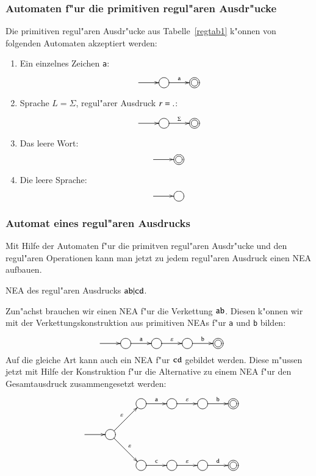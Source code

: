 \subsubsection{Automaten f"ur die primitiven regul"aren Ausdr"ucke}
Die primitiven regul"aren Ausdr"ucke aus Tabelle~\ref{regtab1} k"onnen
von folgenden Automaten akzeptiert werden:
\begin{enumerate}
\item Ein einzelnes Zeichen {\tt a}:
\[
\entrymodifiers={++[o][F]}
\xymatrix{
*+\txt{}\ar[r]
	&{}\ar[r]^{\tt a}
		&*++[o][F=]{}
}
\]
\item Sprache $L=\Sigma$, regul"arer Ausdruck $r={\tt .}$:
\[
\entrymodifiers={++[o][F]}
\xymatrix{
*+\txt{}\ar[r]
	&{}\ar[r]^{\Sigma}
		&*++[o][F=]{}
}
\]
\item Das leere Wort:
\[
\entrymodifiers={++[o][F]}
\xymatrix{
*+\txt{}\ar[r]
	&*++[o][F=]{}
}
\]
\item Die leere Sprache:
\[
\entrymodifiers={++[o][F]}
\xymatrix{
*+\txt{}\ar[r]
	&{}
}
\]
\end{enumerate}

\subsubsection{Automat eines regul"aren Ausdrucks}
Mit Hilfe der Automaten f"ur die primitven regul"aren Ausdr"ucke
und den regul"aren Operationen kann man jetzt zu jedem regul"aren
Ausdruck einen NEA aufbauen.

\begin{beispiel}[\bf Beispiel 1] NEA des regul"aren Ausdrucks
${\tt ab}|{\tt cd}$.

Zun"achst brauchen wir einen NEA f"ur die Verkettung ${\tt ab}$.
Diesen k"onnen wir mit der Verkettungskonstruktion aus primitiven
NEAs f"ur {\tt a} und {\tt b} bilden:
\[
\entrymodifiers={++[o][F]}
\xymatrix{
*+\txt{}\ar[r]
	&{}\ar[r]^{\tt a}
		&{}\ar[r]^{\varepsilon}
			&{}\ar[r]^{\tt b}
				&*++[o][F=]{}
}
\]
Auf die gleiche Art kann auch ein NEA f"ur ${\tt cd}$ gebildet werden.
Diese m"ussen jetzt mit Hilfe der Konstruktion f"ur die Alternative
zu einem NEA f"ur den Gesamtausdruck zusammengesetzt werden:
\[
\entrymodifiers={++[o][F]}
\xymatrix{
*+\txt{}
	&*+\txt{}
		&{}\ar[r]^{\tt a}
			&{}\ar[r]^{\varepsilon}
				&{}\ar[r]^{\tt b}
					&*++[o][F=]{}
\\
*+\txt{} \ar[r]
	&{}\ar[ur]^{\varepsilon} \ar[dr]^{\varepsilon}
\\
*+\txt{}
	&*+\txt{}
		&{}\ar[r]^{\tt c}
			&{}\ar[r]^{\varepsilon}
				&{}\ar[r]^{\tt d}
					&*++[o][F=]{}
}
\]
\end{beispiel}

